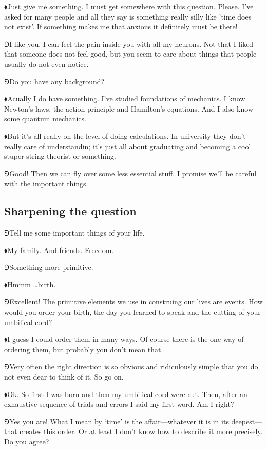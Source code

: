 \documentclass[11pt,oneside%
]{memoir}
\newcommand{\hea}{\(\blacklozenge\)\;}
\newcommand{\heb}{\(\Game\)\;}
\begin{document}
\hea Just give me something. I must get somewhere with this question. Please. I've asked for many people and all they say is something really silly like 'time does not exist'. If something makes me that anxious it definitely must be there!

\heb I like you. I can feel the pain inside you with all my neurons. Not that I liked that someone does not feel good, but you seem to care about things that people usually do not even notice.

\heb Do you have any background?

\hea Acually I do have something. I've studied foundations of mechanics. I know Newton's laws, the action principle and Hamilton's equations. And I also know some quantum mechanics.

\hea But it's all really on the level of doing calculations. In university they don't really care of understandin; it's just all about graduating and becoming a cool stuper string theorist or something.

\heb Good! Then we can fly over some less essential stuff. I promise we'll be careful with the important things.
\subsection{Sharpening the question}
\heb Tell me some important things of your life.

\hea My family. And friends. Freedom.

\heb Something more primitive.

\hea Hmmm \ldots birth.

\heb Excellent! The primitive elements we use in construing our lives are events. How would you order your birth, the day you learned to speak and the cutting of your umbilical cord?

\hea I guess I could order them in many ways. Of course there is the one way of ordering them, but probably you don't mean that.

\heb Very often the right direction is so obvious and ridiculously simple that you do not even dear to think of it. So go on.

\hea Ok. So first I was born and then my umbilical cord were cut. Then, after an exhaustive sequence of trials and errors I said my first word. Am I right?

\heb Yes you are! What I mean by `time' is the affair---whatever it is in its deepest---that creates this order. Or at least I don't know how to describe it more precisely. Do you agree?
\end{document}
